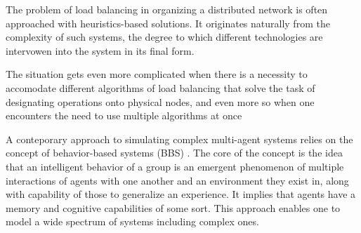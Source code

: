 The problem of load balancing in organizing a distributed network is often approached with heuristics-based solutions.
It originates naturally from the complexity of such systems, the degree to which different technologies are intervowen
into the system in its final form.

The situation gets even more complicated when there is a necessity to accomodate different algorithms of load balancing
that solve the task of designating operations onto physical nodes, and even more so when one encounters the need to
use multiple algorithms at once




A conteporary approach to simulating complex multi-agent systems relies on the concept of
behavior-based systems (BBS) \cite{mataric-1992}. The core of the concept is the idea that an
intelligent behavior of a group is an emergent phenomenon of multiple interactions of agents with
one another and an environment they exist in, along with capability of those to generalize an
experience. It implies that agents have a memory and cognitive capabilities of some
sort. This approach enables one to model a wide spectrum of systems including complex ones.
